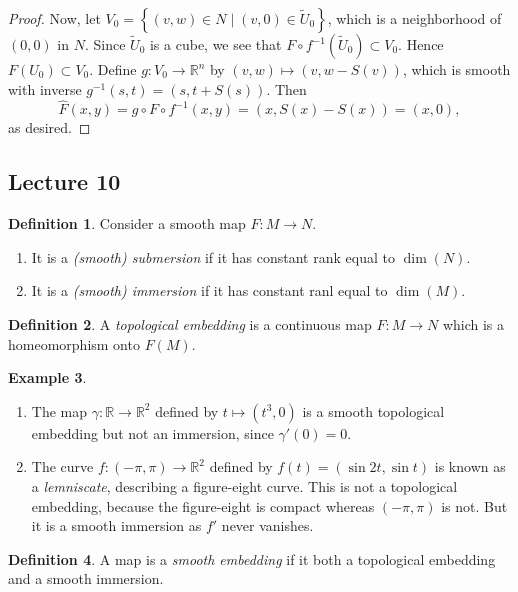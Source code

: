 \documentclass[10pt,letterpaper,cm]{nupset}
\theoremstyle{definition}
\newtheorem{definition}{Definition}[subsection]
\newtheorem{exmp}[definition]{Example}
\theoremstyle{theorem}
\theoremstyle{remark}
\newcommand{\R}{\mathbb R}
\newcommand{\1}{\mathbf{1}}
\newcommand{\0}{\vec 0}
\begin{document}
\begin{proof}
\medskip

 Now, let $V_0 = \left\{(v,w) \in N \mid (v,0)\in \widetilde{U}_0\right\}$, which is a neighborhood of $(0,0)$ in  $N$. Since $\widetilde{U}_0$ is a cube, we see that $F \circ f^{-1}(\widetilde{U}_0) \subset V_0$. Hence $F(U_0) \subset V_0$.  Define $g : V_0 \to \R^n$ by $(v,w) \mapsto (v, w-S(v))$, which is smooth with inverse $g^{-1}(s,t) = (s, t + S(s))$. Then $$\widehat{F}(x,y) = g \circ F \circ f^{-1}(x,y) = (x, S(x) - S(x)) = (x,0),$$ as desired.
\end{proof}

\subsection{Lecture 10}

\begin{definition} 
Consider a smooth map $F: M \to N$. 
\begin{enumerate}
\item It is a \textit{(smooth) submersion} if it has constant rank equal to $\dim(N)$. 
\item It is a \textit{(smooth) immersion} if it has constant ranl equal to $\dim(M)$.
\end{enumerate}
\end{definition}

\begin{definition}
A \textit{topological embedding} is a continuous map $F: M \to N$ which is a homeomorphism onto $F(M)$.
\end{definition}

\begin{exmp} $ $
\begin{enumerate}
\item The map $\gamma: \R \to \R^2$ defined by $t\mapsto \left(t^3, 0\right)$ is a smooth topological embedding but not an immersion, since $\gamma'(0) =0$.
\item The curve $f: \left({-\pi}, \pi\right) \to \R^2$ defined by $f(t) = \left(\sin 2t , \sin t\right)$ is known as a \textit{lemniscate}, describing a figure-eight curve. This is not a topological embedding, because the figure-eight is compact whereas $\left({-\pi}, \pi\right)$ is not. But it is a smooth immersion as $f'$ never vanishes. 
\end{enumerate}
\end{exmp}

\begin{definition}
A map is a \textit{smooth embedding} if it both a topological embedding and a smooth immersion.
\end{definition}
\end{document}
